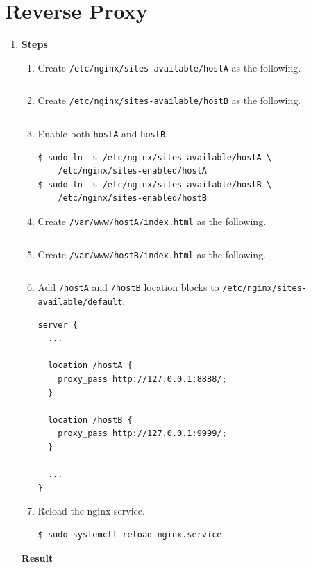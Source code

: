 \documentclass[12pt, a4paper]{article}
\begin{document}
\begin{enumerate}[resume]
\begin{enumerate}
    \end{enumerate}
  \end{enumerate}

  \section*{Reverse Proxy}
  \begin{enumerate}[resume]
    \item \textbf{Steps}
    \begin{enumerate}[label=(\arabic*)]
      \item Create \verb|/etc/nginx/sites-available/hostA| as the following.
      \inputminted{nginx}{server/etc/nginx/sites-available/hostA}
      \item Create \verb|/etc/nginx/sites-available/hostB| as the following.
      \inputminted{nginx}{server/etc/nginx/sites-available/hostB}
      \item Enable both \verb|hostA| and \verb|hostB|.
      \begin{Verbatim}[frame=single]
$ sudo ln -s /etc/nginx/sites-available/hostA \
    /etc/nginx/sites-enabled/hostA
$ sudo ln -s /etc/nginx/sites-available/hostB \
    /etc/nginx/sites-enabled/hostB
      \end{Verbatim}
      \item Create \verb|/var/www/hostA/index.html| as the following.
      \inputminted{html}{server/var/www/hostA/index.html}
      \item Create \verb|/var/www/hostB/index.html| as the following.
      \inputminted{html}{server/var/www/hostB/index.html}
      \item Add \verb|/hostA| and \verb|/hostB| location blocks to
      \verb|/etc/nginx/sites-available/default|.
      \begin{Verbatim}[frame=single]
server {
  ...

  location /hostA {
    proxy_pass http://127.0.0.1:8888/;
  }

  location /hostB {
    proxy_pass http://127.0.0.1:9999/;
  }

  ...
}
      \end{Verbatim}
      \item Reload the nginx service.
      \begin{Verbatim}[frame=single]
$ sudo systemctl reload nginx.service
      \end{Verbatim}
    \end{enumerate}

    \textbf{Result}


\end{enumerate}
\end{document}
